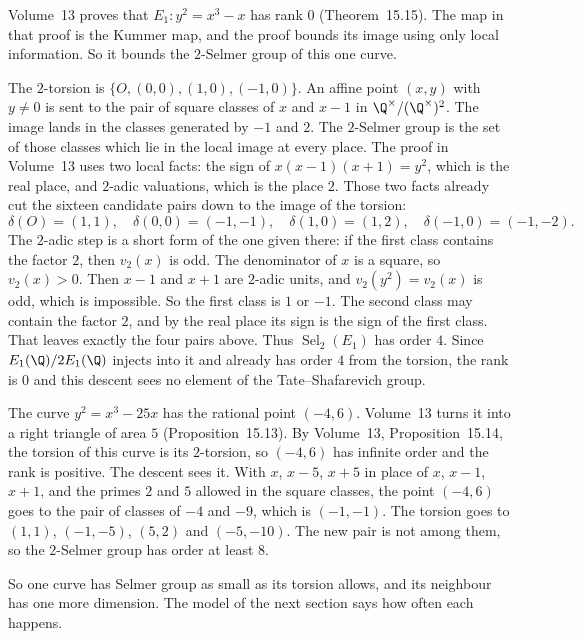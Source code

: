Volume~13 proves that $E_1:y^2=x^3-x$ has rank $0$ (Theorem~15.15). The map in that proof is the Kummer map, and the proof bounds its image using only local information. So it bounds the $2$-Selmer group of this one curve.

The $2$-torsion is $\{O,(0,0),(1,0),(-1,0)\}$. An affine point $(x,y)$ with $y\ne0$ is sent to the pair of square classes of $x$ and $x-1$ in $\Q^\times/(\Q^\times)^2$. The image lands in the classes generated by $-1$ and $2$. The $2$-Selmer group is the set of those classes which lie in the local image at every place. The proof in Volume~13 uses two local facts: the sign of $x(x-1)(x+1)=y^2$, which is the real place, and $2$-adic valuations, which is the place $2$. Those two facts already cut the sixteen candidate pairs down to the image of the torsion:
\[
\delta(O)=(1,1),\quad \delta(0,0)=(-1,-1),\quad \delta(1,0)=(1,2),\quad \delta(-1,0)=(-1,-2).
\]
The $2$-adic step is a short form of the one given there: if the first class contains the factor $2$, then $v_2(x)$ is odd. The denominator of $x$ is a square, so $v_2(x)>0$. Then $x-1$ and $x+1$ are $2$-adic units, and $v_2(y^2)=v_2(x)$ is odd, which is impossible. So the first class is $1$ or $-1$. The second class may contain the factor $2$, and by the real place its sign is the sign of the first class. That leaves exactly the four pairs above. Thus $\operatorname{Sel}_2(E_1)$ has order $4$. Since $E_1(\Q)/2E_1(\Q)$ injects into it and already has order $4$ from the torsion, the rank is $0$ and this descent sees no element of the Tate--Shafarevich group.

\begin{examplex}[$n=5$]
The curve $y^2=x^3-25x$ has the rational point $(-4,6)$. Volume~13 turns it into a right triangle of area $5$ (Proposition~15.13). By Volume~13, Proposition~15.14, the torsion of this curve is its $2$-torsion, so $(-4,6)$ has infinite order and the rank is positive. The descent sees it. With $x$, $x-5$, $x+5$ in place of $x$, $x-1$, $x+1$, and the primes $2$ and $5$ allowed in the square classes, the point $(-4,6)$ goes to the pair of classes of $-4$ and $-9$, which is $(-1,-1)$. The torsion goes to $(1,1)$, $(-1,-5)$, $(5,2)$ and $(-5,-10)$. The new pair is not among them, so the $2$-Selmer group has order at least $8$.
\end{examplex}

So one curve has Selmer group as small as its torsion allows, and its neighbour has one more dimension. The model of the next section says how often each happens.

